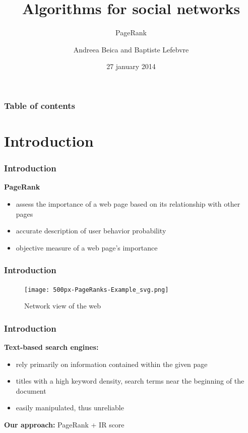 \documentclass[10pt]{beamer}
\begin{document}
  
  \title{Algorithms for social networks}
  \subtitle{PageRank}
  \author{Andreea Beica and Baptiste Lefebvre}
  \date{27 january 2014}
  \maketitle

  
\begin{frame}
  \frametitle{Table of contents}
  \tableofcontents
\end{frame}


\section{Introduction}

\begin{frame}
\frametitle{Introduction}
\textbf{PageRank} 
\begin{itemize}
\item assess the importance of a web page based on its relationship with other pages
\item accurate description of user behavior probability
\item objective measure of a web page's importance
\end{itemize}
\end{frame}

\begin{frame}
\frametitle{Introduction}
\begin{figure}[h]
\texttt{[image: 500px-PageRanks-Example\_svg.png]}
\caption{Network view of the web}
\end{figure}
\end{frame}

\begin{frame}
\frametitle{Introduction}
\textbf{Text-based search engines:}
\begin{itemize}
\item rely primarily on information contained within the given page
\item titles with a high keyword density, search terms near the beginning of the document
\item easily manipulated, thus unreliable

\end{itemize}

\textbf{Our approach:} PageRank + IR score
\end{frame}
\end{document}
